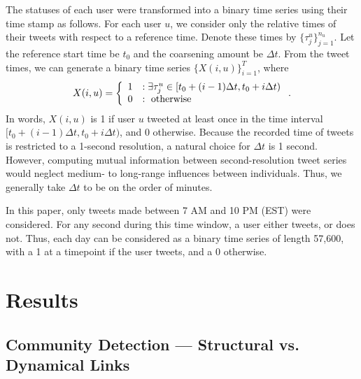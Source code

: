 \documentclass[12pt]{article}
\begin{document}
The statuses of each user were transformed into a binary time series using their time stamp as follows. For each user $u$, we consider only the relative times of their tweets with respect to a reference time. Denote these times by $\{ \tau^{u}_{j}\}_{j = 1}^{n_{u}}$. Let the reference start time be $t_{0}$ and the coarsening amount be $\Delta t$. From the tweet times, we can generate a binary time series $\{ X(i, u)\}_{i = 1}^{T}$, where
\begin{align}
	X(i, u) = \left\{ \begin{array}{cl}
		1 &: \text{$ \exists \tau^{u}_{j} \in [t_{0} + (i - 1) \Delta t, t_{0} + i \Delta t)$} \\
		0 &: \text{ otherwise}
	\end{array}\right. .
\end{align}
In words, $X(i, u)$ is 1 if user $u$ tweeted at least once in the time interval $[t_{0} + (i - 1) \Delta t, t_{0} + i \Delta t)$, and 0 otherwise. Because the recorded time of tweets is restricted to a 1-second resolution, a natural choice for $\Delta t$ is 1 second. However, computing mutual information between second-resolution tweet series would neglect medium- to long-range influences between individuals. Thus, we generally take $\Delta t$ to be on the order of minutes.

In this paper, only tweets made between 7 AM and 10 PM (EST) were considered. For any second during this time window, a user either tweets, or does not. Thus, each day can be considered as a binary time series of length 57,600, with a 1 at a timepoint if the user tweets, and a 0 otherwise.

\section{Results}

\subsection{Community Detection --- Structural vs. Dynamical Links}
\end{document}
